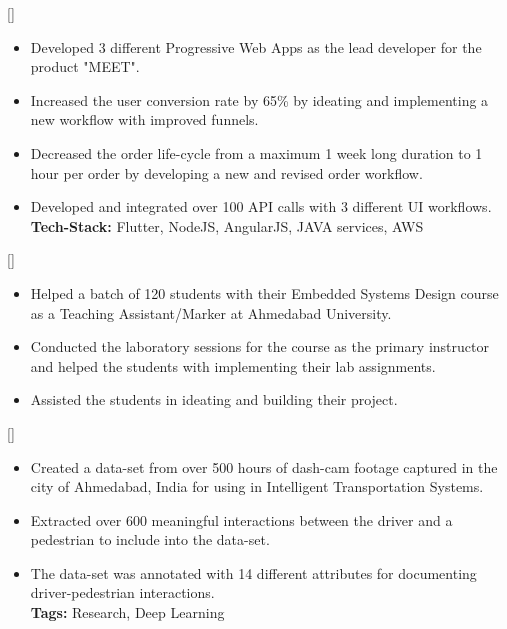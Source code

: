 \documentclass{article}
\begin{document}
[]
\begin{itemize}
    \item Developed 3 different Progressive Web Apps as the lead developer for the product "MEET".
    \item Increased the user conversion rate by 65\% by ideating and implementing a new workflow with improved funnels.
    \item Decreased the order life-cycle from a maximum 1 week long duration to 1 hour per order by developing a new and revised order workflow.
    \item Developed and integrated over 100 API calls with 3 different UI workflows.\\
\textbf{Tech-Stack:} Flutter, NodeJS, AngularJS, JAVA services, AWS 

\end{itemize}

[]
\begin{itemize}
    \item Helped a batch of 120 students with their Embedded Systems Design course as a Teaching Assistant/Marker at Ahmedabad University.
    \item Conducted the laboratory sessions for the course as the primary instructor and helped the students with implementing their lab assignments.
    \item Assisted the students in ideating and building their project.
\end{itemize}


[]
\begin{itemize}
    \item Created a data-set from over 500 hours of dash-cam footage captured in the city of Ahmedabad, India for using in Intelligent Transportation Systems.
    \item Extracted over 600 meaningful interactions between the driver and a pedestrian to include into the data-set.
    \item The data-set was annotated with 14 different attributes for documenting driver-pedestrian interactions. \\
\textbf{Tags:} Research, Deep Learning

\end{itemize}
\end{document}

